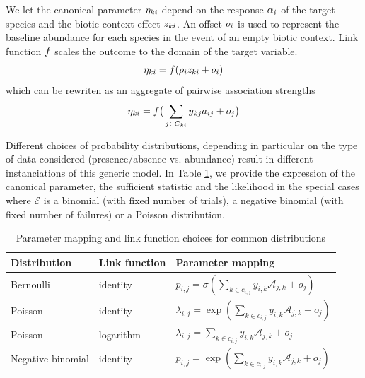 \documentclass[10pt,a4paper]{article}
\begin{document}
We let the canonical parameter $\eta_{ki}$ depend on the response $\alpha_i$ of the target species and the biotic context effect $z_{ki}$. An offset $o_{i}$ is used to represent the baseline abundance for each species in the event of an empty biotic context. Link function $f$ scales the outcome to the domain of the target variable. 
\begin{equation*}
  \eta_{ki} = f(\rho_i z_{ki} + o_i)
\end{equation*}
which can be rewriten as an aggregate of pairwise association strengths
\begin{equation*}
  \eta_{ki} = f\big( \sum_{j \in C_{ki}} y_{kj}  a_{ij} + o_j\big)
\end{equation*}

Different choices of probability distributions, depending in particular on the type of data considered (presence/absence vs. abundance) result in different instanciations of this generic model.
In Table \ref{paramap}, we provide the expression of the canonical parameter, the sufficient statistic and the likelihood in the special cases where $\mathcal{E}$ is a binomial (with fixed number of trials), a negative binomial (with fixed number of failures) or a Poisson distribution. 

\begin{table}[bthp]
  \centering
  \begin{tabular}{lll}
    \toprule
	Distribution & Link function & Parameter mapping  \\
    \midrule
	Bernoulli  & identity  & $p_{i,j}=\sigma(\sum_{k \in c_{i,j}} y_{i,k} \mathcal{A}_{j,k} + o_j)$  \\
	Poisson  & identity  & $\lambda_{i,j}=\exp(\sum_{k \in c_{i,j}} y_{i,k} \mathcal{A}_{j,k} + o_j)$  \\
	Poisson  & logarithm  & $\lambda_{i,j}=\sum_{k \in c_{i,j}} y_{i,k} \mathcal{A}_{j,k} + o_j$  \\
	Negative binomial  & identity  & $p_{i,j}=\exp(\sum_{k \in c_{i,j}} y_{i,k} \mathcal{A}_{j,k} + o_j)$  \\
    \bottomrule
\end{tabular}
\caption{Parameter mapping and link function choices for common distributions}
\label{paramap}
\end{table}
\end{document}
